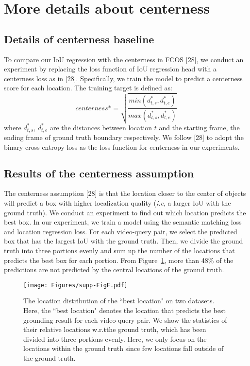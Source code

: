 \documentclass[10pt,twocolumn,letterpaper]{article}
\def\ie{\emph{i.e}\onedot} \def\Ie{\emph{I.e}\onedot}
\def\wrt{w.r.t\onedot} \def\dof{d.o.f\onedot}
\begin{document}
\section{More details about centerness}
\label{sec:centerness}

\subsection{Details of centerness baseline}

To compare our IoU regression with the centerness in FCOS [28], we conduct an experiment by replacing the loss function of IoU regression head with a centerness loss as in [28]. Specifically, we train the model to predict a centerness score for each location. The training target is defined as:
\begin{equation} 
centerness* = \sqrt{\frac{min(d_{t,s}^{*}, d_{t,e}^{*})}{max(d_{t,s}^{*}, d_{t,e}^{*})}}
\end{equation}
where $d_{t,s}^{*}$, $d_{t,e}^{*}$ are the distances between location $t$ and the starting frame, the ending frame of ground truth boundary respectively. We follow [28] to adopt the binary cross-entropy loss as the loss function for centerness in our experiments.




\subsection{Results of the centerness assumption}

The centerness assumption [28] is that the location closer to the center of objects will predict a box with higher localization quality (\ie, a larger IoU with the ground truth). We conduct an experiment to find out which location predicts the best box. In our experiment, we train a model using the semantic matching loss and location regression loss.
For each video-query pair, we select the predicted box that has the largest IoU with the ground truth.
Then, we divide the ground truth into three portions evenly and sum up the number of the locations that predicts the best box for each portion.
From Figure~\ref{fig:centerness}, more than 48\% of the predictions are not predicted by the central locations of the ground truth.

\begin{figure}[!t]
	\centering
	\texttt{[image: Figures/supp-FigE.pdf]}
	\caption{The location distribution of the ``best location" on two datasets. Here, the ``best location" denotes the location that predicts the best grounding result for each video-query pair. We show the statistics of their relative locations \wrt the ground truth, which has been divided into three portions evenly. Here, we only focus on the locations within the ground truth since few locations fall outside of the ground truth.}
	\label{fig:centerness}
\end{figure}


	
\end{document}
